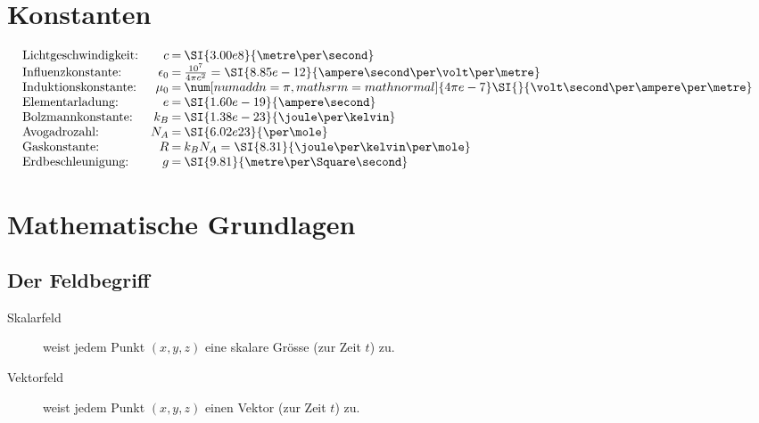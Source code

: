 
\section{Konstanten} %
	{
		\setlength{\mathindent}{0pt}
		\begin{equation*}
			\begin{array}{@{}l@{\quad}r@{\:=\:}l}
				\text{Lichtgeschwindigkeit:} & c & \SI{3.00e8}{\metre\per\second} \\
				\text{Influenzkonstante:} & \epsilon_0 & \frac{10^7}{4\pi c^2} = \SI{8.85e-12}{\ampere\second\per\volt\per\metre} \\
				\text{Induktionskonstante:} & \mu_0 & \num[numaddn=\pi,mathsrm=mathnormal]{4\pi e-7}\SI{}{\volt\second\per\ampere\per\metre} \\
				\text{Elementarladung:} & e & \SI{1.60e-19}{\ampere\second} \\
				\text{Bolzmannkonstante:} & k_B & \SI{1.38e-23}{\joule\per\kelvin} \\
				\text{Avogadrozahl:} & N_A & \SI{6.02e23}{\per\mole} \\
				\text{Gaskonstante:} & R & k_B N_A = \SI{8.31}{\joule\per\kelvin\per\mole} \\
				\text{Erdbeschleunigung:} & g & \SI{9.81}{\metre\per\Square\second}
			\end{array}
		\end{equation*}
	}

\section{Mathematische Grundlagen} %
	
	\subsection{Der Feldbegriff} %
		
		\begin{description}
			
			\item[Skalarfeld]
			weist jedem Punkt $(x,y,z)$ eine skalare Grösse (zur Zeit $t$) zu.
			
			\item[Vektorfeld]
			weist jedem Punkt $(x,y,z)$ einen Vektor (zur Zeit $t$) zu.
			
		\end{description}
		
